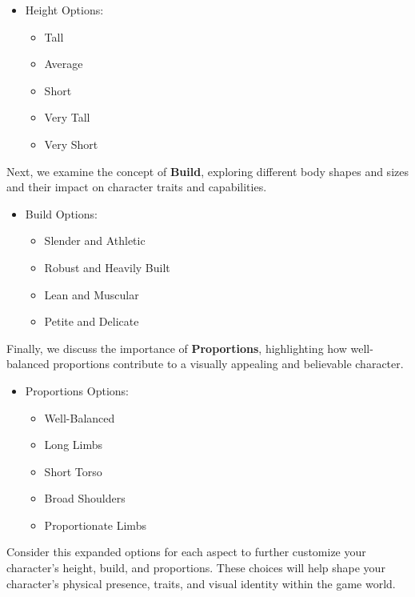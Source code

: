 \begin{itemize}
    \item Height Options:
    \begin{itemize}
        \item Tall
        \item Average
        \item Short
        \item Very Tall
        \item Very Short
    \end{itemize}
\end{itemize}

Next, we examine the concept of \textbf{Build}, exploring different body shapes and sizes and their impact on character traits and capabilities.

\begin{itemize}
    \item Build Options:
    \begin{itemize}
        \item Slender and Athletic
        \item Robust and Heavily Built
        \item Lean and Muscular
        \item Petite and Delicate
    \end{itemize}
\end{itemize}

Finally, we discuss the importance of \textbf{Proportions}, highlighting how well-balanced proportions contribute to a visually appealing and believable character.

\begin{itemize}
    \item Proportions Options:
    \begin{itemize}
        \item Well-Balanced
        \item Long Limbs
        \item Short Torso
        \item Broad Shoulders
        \item Proportionate Limbs
    \end{itemize}
\end{itemize}

Consider this expanded options for each aspect to further customize your character's height, build, and proportions. These choices will help shape your character's physical presence, traits, and visual identity within the game world.

